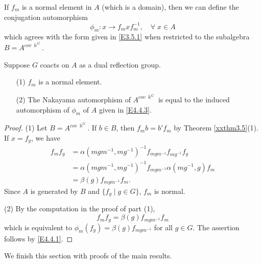 If $f_m$ is a normal element in $A$ (which is a domain), then we can define
the conjugation automorphism 
\begin{equation}
\label{E4.4.3}\tag{E4.4.3}
\phi_{m}: x\to f_{m} x f_{m}^{-1}, \quad \forall\; x\in A
\end{equation}
which agrees with the form given in \eqref{E3.5.1} when restricted to 
the subalgebra $B=A^{cov\; \Bbbk^G}$.

\begin{proposition}
\label{xxpro4.5} 
Suppose $G$ coacts on $A$ as a dual reflection group.
\begin{enumerate}
\item[(1)]
$f_m$ is a normal element.
\item[(2)]
The Nakayama automorphism of $A^{cov\; \Bbbk^G}$
is equal to the induced automorphism of $\phi_{m}$
of $A$ given in \eqref{E4.4.3}.
\end{enumerate}
\end{proposition}

\begin{proof} (1) Let $B=A^{cov\; \Bbbk^G}$. If $b\in B$, then 
$f_m b= b' f_m$ by Theorem \ref{xxthm3.5}(1). If $x=f_g$, 
we have
$$\begin{aligned}
f_{m} f_{g} &=\alpha(mgm^{-1},mg^{-1})^{-1} f_{mgm^{-1}}
f_{mg^{-1}}f_g \\
&=\alpha(mgm^{-1},mg^{-1})^{-1} f_{mgm^{-1}}
\alpha(mg^{-1},g)f_{m}\\
&= \beta(g) f_{mgm^{-1}} f_{m}.
\end{aligned}
$$
Since $A$ is generated by $B$ and $\{f_g\mid g\in G\}$,
$f_m$ is normal.

(2) By the computation in the proof of part (1),
$$f_{m} f_{g}= \beta(g) f_{mgm^{-1}} f_{m}$$
which is equivalent to 
$\phi_{m}(f_g)=\beta(g) f_{mgm^{-1}}$ for all $g\in G$.
The assertion follows by \eqref{E4.4.1}.
\end{proof}

We finish this section with proofs of the main results.

